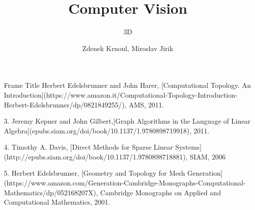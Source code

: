 \title{Computer Vision}
\subtitle{3D}
\author{Zdenek Krnoul, Miroslav Jirik}

\date{} %



\begingroup 
{}

\begin{frame}
	\titlepage
\end{frame}

\addtocounter{framenumber}{-1}
\expandafter\def\expandafter\insertshorttitle\expandafter{%
	\insertshorttitle \hfill \insertframenumber\,/\,\inserttotalframenumber
}


\begin{frame}{Frame Title}
   	Herbert Edelsbrunner and John Harer, [Computational Topology. An Introduction](https://www.amazon.it/Computational-Topology-Introduction-Herbert-Edelsbrunner/dp/0821849255/),  AMS, 2011.

3.	Jeremy Kepner and John Gilbert,[Graph Algorithms in the Language of Linear Algebra](epubs.siam.org/doi/book/10.1137/1.9780898719918), 2011.

4.	Timothy A. Davis, [Direct Methods for Sparse Linear Systems](http://epubs.siam.org/doi/book/10.1137/1.9780898718881), SIAM, 2006

5.	Herbert Edelsbrunner, [Geometry and Topology for Mesh Generation](https://www.amazon.com/Generation-Cambridge-Monographs-Computational-Mathematics/dp/052168207X), Cambridge Monographs on Applied and Computational Mathematics, 2001. \cite{Edelsbrunner2001}
\end{frame}


